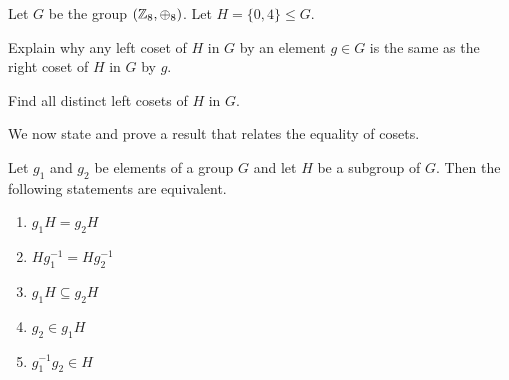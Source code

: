 \begin{exercise}
    Let $G$ be the group $(\mathbb{Z}_8, \oplus_8)$. Let $H = \{0, 4\} \leq G$.
    \begin{partquestions}{\alph*}
        \item Explain why any left coset of $H$ in $G$ by an element $g \in G$ is the same as the right coset of $H$ in $G$ by $g$.
        \item Find all distinct left cosets of $H$ in $G$.
    \end{partquestions}
\end{exercise}

\newpage

We now state and prove a result that relates the equality of cosets.
\begin{lemma}\label{lemma-coset-equality}
    Let $g_1$ and $g_2$ be elements of a group $G$ and let $H$ be a subgroup of $G$. Then the following statements are equivalent.
    \begin{enumerate}
        \item $g_1H = g_2H$
        \item $Hg_1^{-1} = Hg_2^{-1}$
        \item $g_1H \subseteq g_2H$
        \item $g_2 \in g_1H$
        \item $g_1^{-1}g_2 \in H$
    \end{enumerate}
\end{lemma}
